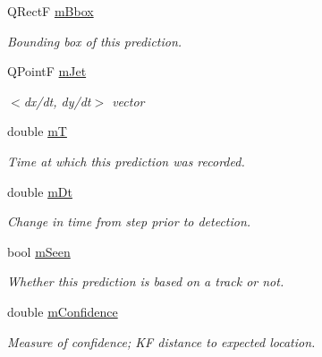 \begin{DoxyCompactItemize}
\item 
Q\+RectF \hyperlink{classKFPrediction_a907ddab43c91eb38026241768e2cecfb}{m\+Bbox}\hypertarget{classKFPrediction_a907ddab43c91eb38026241768e2cecfb}{}\label{classKFPrediction_a907ddab43c91eb38026241768e2cecfb}

\begin{DoxyCompactList}\small\item\em Bounding box of this prediction. \end{DoxyCompactList}\item 
Q\+PointF \hyperlink{classKFPrediction_a579b3b9841f90c3c60e043a72b1e044d}{m\+Jet}\hypertarget{classKFPrediction_a579b3b9841f90c3c60e043a72b1e044d}{}\label{classKFPrediction_a579b3b9841f90c3c60e043a72b1e044d}

\begin{DoxyCompactList}\small\item\em $<$dx/dt, dy/dt$>$ vector \end{DoxyCompactList}\item 
double \hyperlink{classKFPrediction_ae27b38e7b828f4e036945dc16c704148}{mT}\hypertarget{classKFPrediction_ae27b38e7b828f4e036945dc16c704148}{}\label{classKFPrediction_ae27b38e7b828f4e036945dc16c704148}

\begin{DoxyCompactList}\small\item\em Time at which this prediction was recorded. \end{DoxyCompactList}\item 
double \hyperlink{classKFPrediction_accd4aa38016d159c88ec6c8707fcbf99}{m\+Dt}\hypertarget{classKFPrediction_accd4aa38016d159c88ec6c8707fcbf99}{}\label{classKFPrediction_accd4aa38016d159c88ec6c8707fcbf99}

\begin{DoxyCompactList}\small\item\em Change in time from step prior to detection. \end{DoxyCompactList}\item 
bool \hyperlink{classKFPrediction_a28155f8684f2c0310f001a48050f5592}{m\+Seen}\hypertarget{classKFPrediction_a28155f8684f2c0310f001a48050f5592}{}\label{classKFPrediction_a28155f8684f2c0310f001a48050f5592}

\begin{DoxyCompactList}\small\item\em Whether this prediction is based on a track or not. \end{DoxyCompactList}\item 
double \hyperlink{classKFPrediction_aa6f433c4cf1e83fd2b07acbb97f71e0e}{m\+Confidence}\hypertarget{classKFPrediction_aa6f433c4cf1e83fd2b07acbb97f71e0e}{}\label{classKFPrediction_aa6f433c4cf1e83fd2b07acbb97f71e0e}

\begin{DoxyCompactList}\small\item\em Measure of confidence; KF distance to expected location. \end{DoxyCompactList}\end{DoxyCompactItemize}


